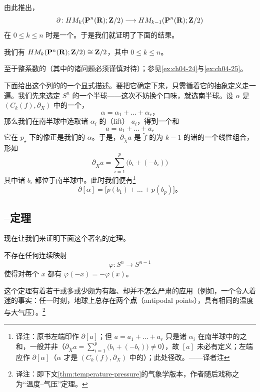 由此推出，\trConnectingHomomorphism
\[
\partial\colon HM_k(\mathbf{P}^n(\mathbf{R});\mathbf{Z}/2)\longrightarrow HM_{k-1}(\mathbf{P}^n(\mathbf{R});\mathbf{Z}/2)
\]
在 $0\le k\le n$ 时是一个\trIsomorphism。于是我们就证明了下面的结果。

\begin{theorem}\label{thm:mod2-hm-projective-space}
我们有 $HM_k(\mathbf{P}^n(\mathbf{R});\mathbf{Z}/2)\cong\mathbf{Z}/2$，其中 $0\le k\le n$。\noqed
\end{theorem}

至于整系数的\trHomology（其中的诸\trOrientation{}问题必须谨慎对待）；参见\cref{ex:ch04-24}与\cref{ex:ch04-25}。

下面给出这个\trExact{}列的\trConnectingHomomorphism{}的一个显式描述。要把它确定下来，只需循着它的抽象定义走一遍。我们先来选定 $S^n$ 的一个半球——这次不妨换个口味，就选南半球。设 $\alpha$ 是 $(C_k(f),\partial_X)$ 中的一个\trCycle，
\[
\alpha=\alpha_1+\dots+\alpha_r\text{，}
\]
那么我们在南半球中选取诸 $\alpha_i$ 的\textbf{\trLift}（lift） $a_i$，得到一个和
\[
a=a_1+\dots+a_r
\]
它在 $p_\star$ 下的像正是我们的\trCycle{} $\alpha$。于是，$\partial_{\widetilde X}a$ 是 $\widetilde f$ 的\trIndex{}为 $k-1$ 的诸\trCriticalPoint{}的一个线性组合，形如
\[
\partial_{\widetilde X}a=\sum_{i=1}^{p}\bigl(b_i+(-b_i)\bigr)
\]
其中诸 $b_i$ 都位于南半球中。此时我们便有\footnote{译注：原书左端印作 $\partial[a]$；但 $a=a_1+\dots+a_r$ 只是诸 $\alpha_i$ 在南半球中的\trLift{}之和，一般并非\trCycle（$\partial_{\widetilde X}a=\sum_{i=1}^{p}\bigl(b_i+(-b_i)\bigr)\neq 0$），故 $[a]$ 未必有定义；左端应作 $\partial[\alpha]$（$\alpha$ 才是 $(C_k(f),\partial_X)$ 中的\trCycle）；此处径改。——译者注}
\[
\partial[\alpha]=\bigl[p(b_1)+\dots+p(b_p)\bigr]\text{。}
\]

\subsection{\trBorsuk{}--\trUlam{}定理}
\label{subsec:borsuk-ulam-theorem}

现在让我们来证明下面这个著名的定理。

\begin{theorem}[\trBorsuk{}--\trUlam]\label{thm:borsuk-ulam}
不存在任何连续映射
\[
\varphi\colon S^n\longrightarrow S^{n-1}
\]
使得对每个 $x$ 都有 $\varphi(-x)=-\varphi(x)$。
\end{theorem}

这个定理有着若干或多或少颇为有趣、却并不怎么严肃的应用（例如，一个令人着迷的事实：任一时刻，地球上总存在两个\textbf{\trAntipodal{}点}（antipodal points），具有相同的温度与大气压）。\footnote{译注：即下文\cref{thm:temperature-pressure}的气象学版本，作者随后戏称之为“温度--气压”定理。}

